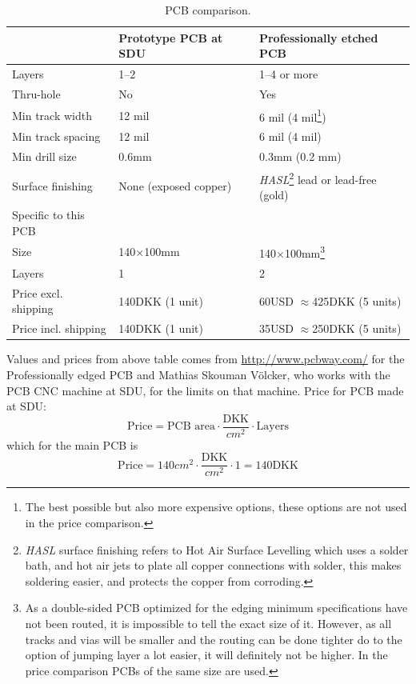 \documentclass[11pt]{article}
\begin{document}
\begin{table}[h]
  \centering
  \begin{tabular}{l|l|l}
    & Prototype PCB at SDU & Professionally etched PCB \\ \hline
    Layers & 1--2 & 1--4 or more \\
    Thru-hole & No & Yes \\
    Min track width & 12 mil & 6 mil (4 mil\footnote{The best possible but also more expensive options, these options are not used in the price comparison.})  \\
    Min track spacing  & 12 mil & 6 mil (4 mil)  \\ 
    Min drill size  & 0.6mm  & 0.3mm (0.2 mm)  \\ 
    Surface finishing  & None (exposed copper) & \textit{HASL}\footnote{\textit{HASL} surface finishing refers to Hot Air Surface Levelling which uses a solder bath, and hot air jets to plate all copper connections with solder, this makes soldering easier, and protects the copper from corroding.} lead or lead-free (gold) \\ \hline
    Specific to this PCB & & \\ \hline
    Size & 140$\times$100mm  & 140$\times$100mm\footnote{As a double-sided PCB optimized for the edging minimum specifications have not been routed, it is impossible to tell the exact size of it. However, as all tracks and vias will be smaller and the routing can be done tighter do to the option of jumping layer a lot easier, it will definitely not be higher. In the price comparison PCBs of the same size are used.}  \\ 
    Layers  & 1 & 2  \\
    Price excl. shipping  & 140DKK (1 unit)  & 60USD $\approx$425DKK (5 units) \\ 
    Price incl. shipping  & 140DKK (1 unit)  & 35USD $\approx$250DKK (5 units) \\ 
  \end{tabular}
  \caption{PCB comparison.}
  \label{my-label}
\end{table}
Values and prices from above table comes from \url{http://www.pcbway.com/} for the Professionally edged PCB and Mathias Skouman V\"olcker, who works with the PCB CNC machine at SDU, for the limits on that machine. Price for PCB made at SDU:
$$\text{Price}=\text{PCB area} \cdot\frac{\text{DKK}}{cm^2}\cdot \text{Layers}$$
which for the main PCB is
$$\text{Price}=140cm^2 \cdot\frac{\text{DKK}}{cm^2}\cdot 1=140\text{DKK}$$
\end{document}
